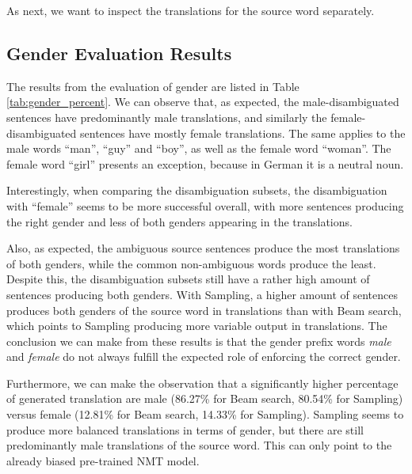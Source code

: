 As next, we want to inspect the translations for the source word separately.

\clearpage

\subsection{Gender Evaluation Results}
\label{ch:Base_Experiment:Results:Gender}

The results from the evaluation of gender are listed in Table \ref{tab:gender_percent}. We can observe that, as expected, the male-disambiguated sentences have predominantly male translations, and similarly the female-disambiguated sentences have mostly female translations. The same applies to the male words “man”, “guy” and “boy”, as well as the female word “woman”. The female word “girl” presents an exception, because in German it is a neutral noun.

Interestingly, when comparing the disambiguation subsets, the disambiguation with “female” seems to be more successful overall, with more sentences producing the right gender and less of both genders appearing in the translations.

Also, as expected, the ambiguous source sentences produce the most translations of both genders, while the common non-ambiguous words produce the least. Despite this, the disambiguation subsets still have a rather high amount of sentences producing both genders. With Sampling, a higher amount of sentences produces both genders of the source word in translations than with Beam search, which points to Sampling producing more variable output in translations. The conclusion we can make from these results is that the gender prefix words \textit{male} and \textit{female} do not always fulfill the expected role of enforcing the correct gender. 

Furthermore, we can make the observation that a significantly higher percentage of generated translation are male (86.27\% for Beam search, 80.54\% for Sampling) versus female (12.81\% for Beam search, 14.33\% for Sampling). Sampling seems to produce more balanced translations in terms of gender, but there are still predominantly male translations of the source word. This can only point to the already biased pre-trained NMT model. 

